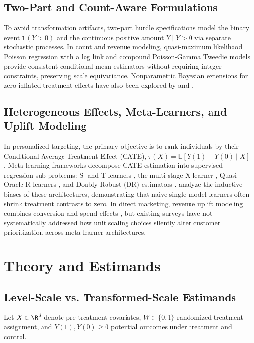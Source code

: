 \documentclass[conference]{IEEEtran}
\newcommand{\E}{\mathbb{E}}
\begin{document}
\subsection{Two-Part and Count-Aware Formulations}
To avoid transformation artifacts, two-part hurdle specifications \citep{mullahy2024whytransform} model the binary event $\mathbf{1}(Y>0)$ and the continuous positive amount $Y \mid Y>0$ via separate stochastic processes. In count and revenue modeling, quasi-maximum likelihood Poisson regression with a log link \citep{chen2024logszeros} and compound Poisson-Gamma Tweedie models provide consistent conditional mean estimators without requiring integer constraints, preserving scale equivariance. Nonparametric Bayesian extensions for zero-inflated treatment effects have also been explored by \cite{oganisian2021zeroinflated} and \cite{kim2024zeroinflatedcate}.

\subsection{Heterogeneous Effects, Meta-Learners, and Uplift Modeling}
In personalized targeting, the primary objective is to rank individuals by their Conditional Average Treatment Effect (CATE), $\tau(X) = \E[Y(1) - Y(0) \mid X]$. Meta-learning frameworks decompose CATE estimation into supervised regression sub-problems: S- and T-learners \citep{kunzel2019metalearners}, the multi-stage X-learner \citep{kunzel2019metalearners}, Quasi-Oracle R-learners \citep{nie2021quasioracle}, and Doubly Robust (DR) estimators \citep{kennedy2023towards}. \cite{curth2021nonparametric} analyze the inductive biases of these architectures, demonstrating that naive single-model learners often shrink treatment contrasts to zero. In direct marketing, revenue uplift modeling combines conversion and spend effects \citep{gubela2020response, baier2022profit, he2024rankability}, but existing surveys \citep{gutierrez2017uplift, zhang2022unified} have not systematically addressed how unit scaling choices silently alter customer prioritization across meta-learner architectures.

\section{Theory and Estimands}
\label{sec:theory}

\subsection{Level-Scale vs. Transformed-Scale Estimands}
Let $X \in \R^d$ denote pre-treatment covariates, $W \in \{0, 1\}$ randomized treatment assignment, and $Y(1), Y(0) \ge 0$ potential outcomes under treatment and control.
\end{document}
